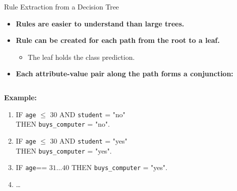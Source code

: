\begin{frame}{Rule Extraction from a Decision Tree}
	\begin{itemize}
		\item \textbf{Rules are {\color{airforceblue}easier to understand} than large trees.}
		\item \textbf{Rule can be created for {\color{airforceblue}each path from the root to a leaf.}}
		      \begin{itemize}
			      \item The leaf holds the class prediction.
		      \end{itemize}
		\item \textbf{Each attribute-value pair along the path forms a conjunction:}
	\end{itemize}
	\vspace*{1em}
	\begin{columns}
		\begin{column}{0.7\textwidth}
			\textbf{Example:}
			\begin{enumerate}
				\item IF \texttt{age} $\leq$ 30 AND \texttt{student} = "no" \\
				      THEN \texttt{buys\_computer} = "no".
				\item IF \texttt{age} $\leq$ 30 AND \texttt{student} = "yes" \\
				      THEN \texttt{buys\_computer} = "yes".
				\item IF \texttt{age}== $31\ldots40$ THEN \texttt{buys\_computer} = "yes".
				\item \dots
			\end{enumerate}
		\end{column}
		\begin{column}{0.3\textwidth}
			\begin{figure}[h]
				\centering
				
			\end{figure}
		\end{column}
	\end{columns}
\end{frame}

